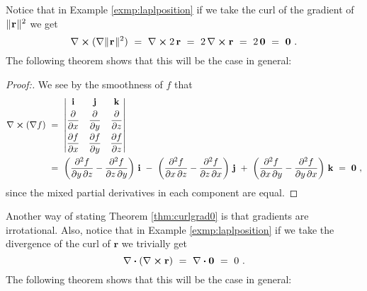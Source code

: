 Notice that in Example \ref{exmp:laplposition} if we take the curl of the gradient of $\lVert\mspace{1mu}\mathbf{r}\mspace{1mu}\rVert^2$ we get
\begin{displaymath}
 \nabla \bm{\times} ( \nabla \lVert\mspace{1mu}\mathbf{r}\mspace{1mu}\rVert^2 ) ~=~ \nabla \bm{\times} 2\,\mathbf{r} ~=~
 2\,\nabla \bm{\times} \mathbf{r} ~=~ 2\,\mathbf{0} ~=~ \mathbf{0} ~.
\end{displaymath}
The following theorem shows that this will be the case in general:

\begin{proofbar}\begin{proof}[Proof:]
 We see by the smoothness of $f$ that
 \begin{align*}
  \Crossprod{\nabla}{(\nabla f)} ~&=~ \begin{vmatrix}
   \mathbf{i} & \mathbf{j} & \mathbf{k} \smallskip\\ \dfrac{\partial}{\partial x} & \dfrac{\partial}{\partial y} &
    \dfrac{\partial}{\partial z} \smallskip\\
   \dfrac{\partial f}{\partial x} & \dfrac{\partial f}{\partial y} & \dfrac{\partial f}{\partial z}
   \end{vmatrix}\\
  &=~ \left( \frac{\partial^2 f}{\partial y\,\partial z}-\frac{\partial^2 f}{\partial z\,\partial y} \right) \,\mathbf{i}
   ~-~ \left( \frac{\partial^2 f}{\partial x\,\partial z}-\frac{\partial^2 f}{\partial z\,\partial x} \right) \,\mathbf{j}
   ~+~ \left( \frac{\partial^2 f}{\partial x\,\partial y}-\frac{\partial^2 f}{\partial y\,\partial x} \right) \,\mathbf{k}
  ~=~ \mathbf{0} ~,
 \end{align*}
 since the mixed partial derivatives in each component are equal.
\end{proof}\end{proofbar}


Another way of stating Theorem \ref{thm:curlgrad0} is that gradients are irrotational. Also,
notice that in Example \ref{exmp:laplposition} if we take the divergence of the curl of $\mathbf{r}$ we trivially get
\begin{displaymath}
 \nabla \bm{\cdot} (\nabla \bm{\times} \mathbf{r}) ~=~ \nabla \bm{\cdot} \mathbf{0} ~=~ 0 ~.
\end{displaymath}
The following theorem shows that this will be the case in general:

